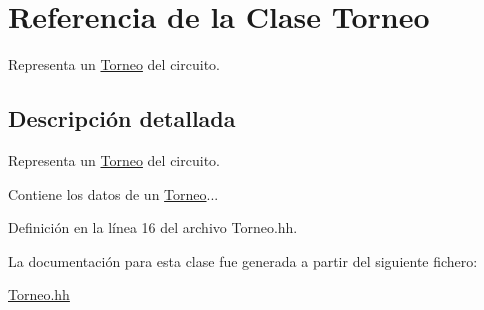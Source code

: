 \hypertarget{class_torneo}{}\section{Referencia de la Clase Torneo}
\label{class_torneo}


Representa un \mbox{\hyperlink{class_torneo}{Torneo}} del circuito.  




\subsection{Descripción detallada}
Representa un \mbox{\hyperlink{class_torneo}{Torneo}} del circuito. 

Contiene los datos de un \mbox{\hyperlink{class_torneo}{Torneo}}... 

Definición en la línea 16 del archivo Torneo.\+hh.



La documentación para esta clase fue generada a partir del siguiente fichero\+:\begin{DoxyCompactItemize}
\item 
\mbox{\hyperlink{_torneo_8hh}{Torneo.\+hh}}\end{DoxyCompactItemize}

